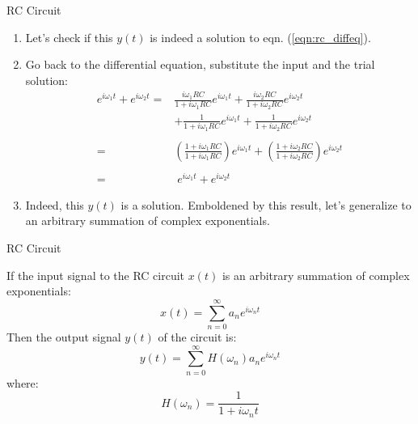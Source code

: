 \documentclass[hyperref={bookmarks=false},aspectratio=169]{beamer}
\begin{document}
	\begin{frame}{RC Circuit}
		\begin{enumerate}
			\item Let's check if this $y(t)$ is indeed a solution to eqn. (\ref{eqn:rc_diffeq}).
			\item Go back to the differential equation, substitute the input and the trial solution:
				\begin{align*}
					e^{i\omega_1 t} + e^{i\omega_2 t} = &\frac{i\omega_1 RC}{1 + i\omega_1 RC}e^{i\omega_1 t} + \frac{i\omega_2 RC}{1 + i\omega_2 RC}e^{i\omega_2 t} \\
					& + \frac{1}{1 + i\omega_1 RC}e^{i\omega_1 t} + \frac{1}{1 + i\omega_2 RC}e^{i\omega_2 t} \\ \\
					= &\left(\frac{1 + i\omega_1 RC}{1 + i\omega_1 RC}\right) e^{i\omega_1 t} + \left(\frac{1 + i\omega_2 RC}{1 + i\omega_2 RC}\right) e^{i\omega_2 t} \\ \\
					= &\; e^{i\omega_1 t} + e^{i\omega_2 t}
				\end{align*}
			\item Indeed, this $y(t)$ is a solution. Emboldened by this result, let's generalize to an arbitrary summation of complex exponentials.
		\end{enumerate}
	\end{frame}	
	
	\begin{frame}{RC Circuit}
		\begin{tcolorbox}[colback=StanfordRed!5!white, colframe=StanfordRed!75!black, title=Statement]
			If the input signal to the RC circuit $x(t)$ is an arbitrary summation of complex exponentials:
				\begin{equation}
					x(t) = \sum_{n=0}^{\infty}a_n e^{i\omega_n t}
				\end{equation}
			Then the output signal $y(t)$ of the circuit is:
				\begin{equation} \label{eqn:output_to_arbitrary}
					y(t) = \sum_{n=0}^{\infty} H(\omega_n) a_n e^{i\omega_n t}
				\end{equation}
			where:
				\begin{equation}
					H(\omega_n) = \frac{1}{1 + i\omega_n t}
				\end{equation}
		\end{tcolorbox}
	\end{frame}
	
\end{document}
